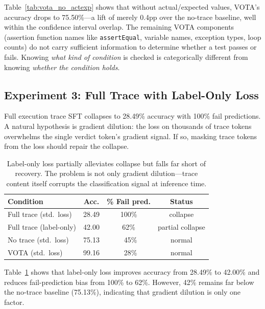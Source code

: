 \documentclass[11pt,a4paper]{article}
\begin{document}
Table~\ref{tab:vota_no_actexp} shows that without actual/expected values, VOTA's accuracy drops to 75.50\%---a lift of merely 0.4pp over the no-trace baseline, well within the confidence interval overlap. The remaining VOTA components (assertion function names like \texttt{assertEqual}, variable names, exception types, loop counts) do not carry sufficient information to determine whether a test passes or fails. Knowing \emph{what kind of condition} is checked is categorically different from knowing \emph{whether the condition holds}.

\subsection{Experiment 3: Full Trace with Label-Only Loss}
\label{sec:exp3}

Full execution trace SFT collapses to 28.49\% accuracy with 100\% fail predictions. A natural hypothesis is gradient dilution: the loss on thousands of trace tokens overwhelms the single verdict token's gradient signal. If so, masking trace tokens from the loss should repair the collapse.

\begin{table}[t]
\centering
\small
\begin{tabular}{lccc}
\toprule
\textbf{Condition} & \textbf{Acc.} & \textbf{\% Fail pred.} & \textbf{Status} \\
\midrule
Full trace (std.\ loss) & 28.49 & 100\% & collapse \\
Full trace (label-only) & 42.00 & 62\% & partial collapse \\
No trace (std.\ loss) & 75.13 & ~45\% & normal \\
VOTA (std.\ loss) & 99.16 & ~28\% & normal \\
\bottomrule
\end{tabular}
\caption{Label-only loss partially alleviates collapse but falls far short of recovery. The problem is not only gradient dilution---trace content itself corrupts the classification signal at inference time.}
\label{tab:label_only}
\end{table}

Table~\ref{tab:label_only} shows that label-only loss improves accuracy from 28.49\% to 42.00\% and reduces fail-prediction bias from 100\% to 62\%. However, 42\% remains far below the no-trace baseline (75.13\%), indicating that gradient dilution is only one factor.
\end{document}

